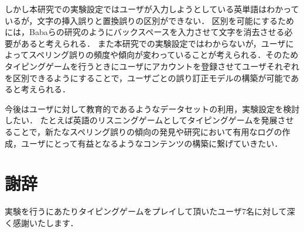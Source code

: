 \documentclass{jarticle}
\begin{document}
しかし本研究での実験設定ではユーザが入力しようとしている英単語はわかっているが，文字の挿入誤りと置換誤りの区別ができない．
区別を可能にするためには，Babaらの研究\cite{babaACL2012}のようにバックスペースを入力させて文字を消去させる必要があると考えられる．
また本研究での実験設定ではわからないが，ユーザによってスペリング誤りの頻度や傾向が変わっていることが考えられる．そのためタイピングゲームを行うときにユーザにアカウントを登録させてユーザそれぞれを区別できるようにすることで，ユーザごとの誤り訂正モデルの構築が可能であると考えられる．

今後はユーザに対して教育的であるようなデータセットの利用，実験設定を検討したい．
たとえば英語のリスニングゲームとしてタイピングゲームを発展させることで，新たなスペリング誤りの傾向の発見や研究において有用なログの作成，ユーザにとって有益となるようなコンテンツの構築に繋げていきたい．

\section*{謝辞}
実験を行うにあたりタイピングゲームをプレイして頂いたユーザ7名に対して深く感謝いたします．



%
\end{document}

